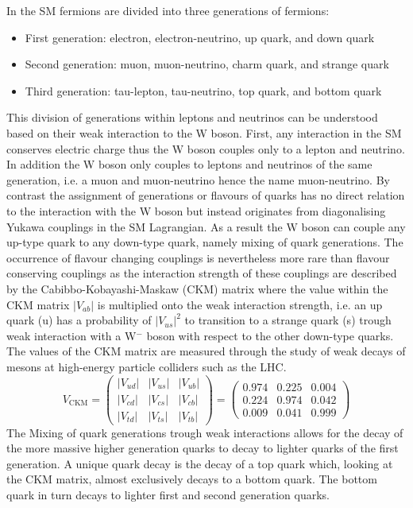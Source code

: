 In the SM fermions are divided into three generations of fermions:
\begin{itemize}
    \item First generation: electron, electron-neutrino, up quark, and down quark
    \item Second generation: muon, muon-neutrino, charm quark, and strange quark
    \item Third generation: tau-lepton, tau-neutrino, top quark, and bottom quark
\end{itemize}
This division of generations within leptons and neutrinos can be understood based on their weak interaction to the W boson. First, any interaction in the SM conserves electric charge thus the W boson couples only to a lepton and neutrino. In addition the W boson only couples to leptons and neutrinos of the same generation, i.e. a muon and muon-neutrino hence the name muon-neutrino. By contrast the assignment of generations or flavours of quarks has no direct relation to the interaction with the W boson but instead originates from diagonalising Yukawa couplings in the SM Lagrangian. As a result the W boson can couple any up-type quark to any down-type quark, namely mixing of quark generations. The occurrence of flavour changing couplings is nevertheless more rare than flavour conserving couplings as the interaction strength of these couplings are described by the Cabibbo-Kobayashi-Maskaw (CKM) matrix where the value within the CKM matrix $|V_{ab}|$ is multiplied onto the weak interaction strength, i.e. an up quark (u) has a probability of $|V_{us}|^2$ to transition to a strange quark (s) trough weak interaction with a W$^-$ boson with respect to the other down-type quarks. The values of the CKM matrix are measured through the study of weak decays of mesons at high-energy particle colliders such as the LHC. 
\begin{equation}\label{CKM}
    V_{\text{CKM}} = \begin{pmatrix} |V_{ud}| & |V_{us}| & |V_{ub}| \\ |V_{cd}| & |V_{cs}| & |V_{cb}| \\ |V_{td}| & |V_{ts}| & |V_{tb}| \end{pmatrix} = \begin{pmatrix} 0.974 & 0.225 & 0.004 \\ 0.224 & 0.974 & 0.042 \\ 0.009 & 0.041 & 0.999 \end{pmatrix} 
\end{equation}
The Mixing of quark generations trough weak interactions allows for the decay of the more massive higher generation quarks to decay to lighter quarks of the first generation. A unique quark decay is the decay of a top quark which, looking at the CKM matrix, almost exclusively decays to a bottom quark. The bottom quark in turn decays to lighter first and second generation quarks.